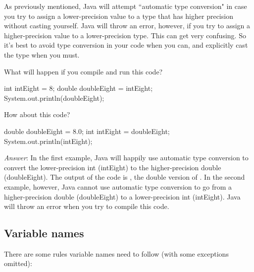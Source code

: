 As previously mentioned, Java will attempt ``automatic type conversion" in case you try to assign a lower-precision value to a type that has higher precision without casting yourself. Java will throw an error, however, if you try to assign a higher-precision value to a lower-precision type. This can get very confusing. So it's best to avoid type conversion in your code when you can, and explicitly cast the type when you must. 

\begin{exercise}
  What will happen if you compile and run this code? 
  \begin{code}
    int intEight = 8;
   double doubleEight = intEight;
   System.out.println(doubleEight);
  \end{code}
  
  How about this code? 
  \begin{code}
  double doubleEight = 8.0;
  int intEight = doubleEight; 
  System.out.println(intEight);
  \end{code}
  
\noindent \emph{Answer}: In the first example, Java will happily use automatic type conversion to convert the lower-precision int (intEight) to the higher-precision double (doubleEight). The output of the code is , the double version of . In the second example, however, Java cannot use automatic type conversion to go from a higher-precision double (doubleEight) to a lower-precision int (intEight). Java will throw an error when you try to compile this code. 
\end{exercise}

\subsection{Variable names}

There are some rules variable names need to follow (with some exceptions omitted):

